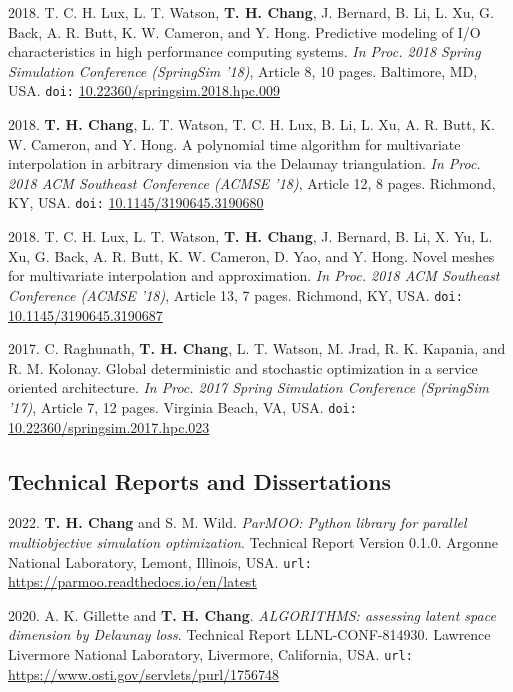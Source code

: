 \documentclass[10pt]{article}
\begin{document}
\medskip

2018. T. C. H. Lux, L. T. Watson, {\bf T. H. Chang}, J. Bernard, B. Li, L. Xu, G. Back, A. R. Butt, K. W. Cameron, and Y. Hong. Predictive modeling of I/O characteristics in high performance computing systems. {\sl In Proc. 2018 Spring Simulation Conference (SpringSim '18)}, Article 8, 10 pages. Baltimore, MD, USA. {\tt doi:} \href{https://doi.org/10.22360/springsim.2018.hpc.009}{10.22360/springsim.2018.hpc.009}

\medskip

2018. {\bf T. H. Chang}, L. T. Watson, T. C. H. Lux, B. Li, L. Xu, A. R. Butt, K. W. Cameron, and Y. Hong. A polynomial time algorithm for multivariate interpolation in arbitrary dimension via the Delaunay triangulation. {\sl In Proc. 2018 ACM Southeast Conference (ACMSE '18)}, Article 12, 8 pages. Richmond, KY, USA. {\tt doi:} \href{https://doi.org/10.1145/3190645.3190680}{10.1145/3190645.3190680}

\medskip

2018. T. C. H. Lux, L. T. Watson, {\bf T. H. Chang}, J. Bernard, B. Li, X. Yu, L. Xu, G. Back, A. R. Butt, K. W. Cameron, D. Yao, and Y. Hong. Novel meshes for multivariate interpolation and approximation. {\sl In Proc. 2018 ACM Southeast Conference (ACMSE '18)}, Article 13, 7 pages. Richmond, KY, USA. {\tt doi:} \href{https://doi.org/10.1145/3190645.3190687}{10.1145/3190645.3190687}

\medskip

2017. C. Raghunath, {\bf T. H. Chang}, L. T. Watson, M. Jrad, R. K. Kapania, and R. M. Kolonay. Global deterministic and stochastic optimization in a service oriented architecture. {\sl In Proc. 2017 Spring Simulation Conference (SpringSim '17)}, Article 7, 12 pages. Virginia Beach, VA, USA. {\tt doi:} \href{https://doi.org/10.22360/springsim.2017.hpc.023}{10.22360/springsim.2017.hpc.023}
\subsection*{Technical Reports and Dissertations}
2022. {\bf T. H. Chang} and S. M. Wild. {\sl ParMOO: Python library for parallel multiobjective simulation optimization}. Technical Report Version 0.1.0. Argonne National Laboratory, Lemont, Illinois, USA. {\tt url:} \url{https://parmoo.readthedocs.io/en/latest}

\medskip

2020. A. K. Gillette and {\bf T. H. Chang}. {\sl ALGORITHMS: assessing latent space dimension by Delaunay loss}. Technical Report LLNL-CONF-814930. Lawrence Livermore National Laboratory, Livermore, California, USA. {\tt url:} \url{https://www.osti.gov/servlets/purl/1756748}
\end{document}
